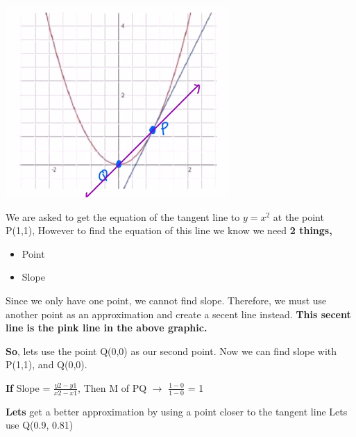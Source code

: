 \documentclass{report}
\begin{document}
    \bigbreak \noindent 
    \begin{center}
        \includegraphics[scale=0.8]{1.png}    
    \end{center}
    

    We are asked to get the equation of the tangent line to $y=x^2$ at the point P(1,1), 
    However to find the equation of this line we know we need \textbf{2 things,} 
    \begin{itemize}
        \item Point
        \item Slope
    \end{itemize}

    \noindent Since we only have one point, we cannot find slope. Therefore, we must use 
    another point as an approximation and create a secent line instead. \textbf{This secent line is 
    the pink line in the above graphic.}
    
    \bigbreak \noindent 
    \textbf{So}, lets use the point Q(0,0) as our second point. Now we can find slope with 
    P(1,1), and Q(0,0).

    \bigbreak \noindent 
    \begin{large}
        \textbf{If} Slope = $\frac{y2-y1}{x2-x1}$, Then M of PQ $\rightarrow$ $ \frac{1-0}{1-0}$ = 1
    \end{large}

    \bigbreak \noindent 
    \textbf{Lets} get a better approximation by using a point closer to the tangent line
    Lets use Q(0.9, 0.81)
\end{document}
